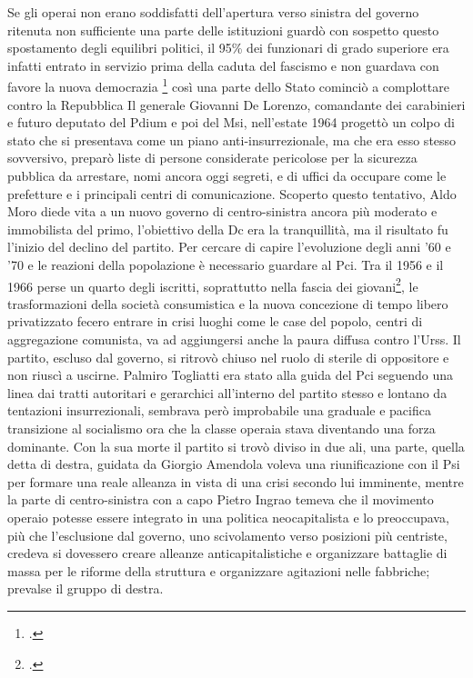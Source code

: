 Se gli operai non erano soddisfatti dell'apertura verso sinistra del governo ritenuta non sufficiente una parte delle istituzioni guardò con sospetto questo spostamento degli equilibri politici, il 95\% dei funzionari di grado superiore era infatti entrato in servizio prima della caduta del fascismo e non guardava con favore la nuova democrazia \footcite{Ginsborg4} così una parte dello Stato cominciò a complottare contro la Repubblica
Il generale Giovanni De Lorenzo, comandante dei carabinieri e futuro deputato del Pdium e poi del Msi, nell'estate 1964 progettò un colpo di stato che si presentava come un piano anti-insurrezionale, ma che era esso stesso sovversivo, preparò liste di persone considerate pericolose per la sicurezza pubblica da arrestare, nomi ancora oggi segreti, e di uffici da occupare come le prefetture e i principali centri di comunicazione.
Scoperto questo tentativo, Aldo Moro diede vita a un nuovo governo di centro-sinistra ancora più moderato e immobilista del primo, l'obiettivo della Dc era la tranquillità, ma il risultato fu l'inizio del declino del partito.
Per cercare di capire l'evoluzione degli anni '60 e '70 e le reazioni della popolazione è necessario guardare al Pci.
Tra il 1956 e il 1966 perse un quarto degli iscritti, soprattutto nella fascia dei giovani\footcite{Ginsborg5}, le trasformazioni della società consumistica e la nuova concezione di tempo libero privatizzato fecero entrare in crisi luoghi come le case del popolo, centri di aggregazione comunista, va ad aggiungersi anche la paura diffusa contro l'Urss.
Il partito, escluso dal governo, si ritrovò chiuso nel ruolo di sterile di oppositore e non riuscì a uscirne. 
Palmiro Togliatti era stato alla guida del Pci seguendo una linea dai tratti autoritari e gerarchici all'interno del partito stesso e lontano da tentazioni insurrezionali, sembrava però improbabile una graduale e pacifica transizione al socialismo ora che la classe operaia stava diventando una forza dominante.
Con la sua morte il partito si trovò diviso in due ali, una parte, quella detta di destra, guidata da Giorgio Amendola voleva una riunificazione con il Psi per formare una reale alleanza in vista di una crisi secondo lui imminente, mentre la parte di centro-sinistra con a capo Pietro Ingrao temeva che il movimento operaio potesse essere integrato in una politica neocapitalista e lo preoccupava, più che l'esclusione dal governo, uno scivolamento verso posizioni più centriste, credeva si dovessero creare alleanze anticapitalistiche e organizzare battaglie di massa per le riforme della struttura e organizzare agitazioni nelle fabbriche; prevalse il gruppo di destra. 
